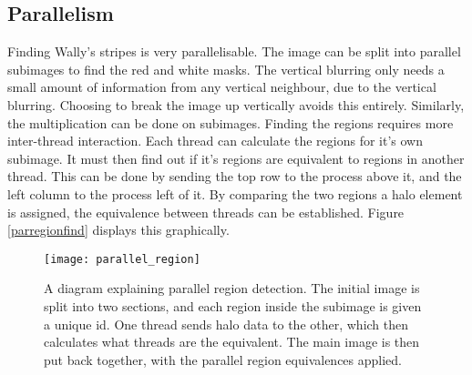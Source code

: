 \documentclass[../main.tex]{subfiles}
\begin{document}
  \subsection{Parallelism}
    Finding Wally's stripes is very parallelisable.
    The image can be split into parallel subimages to find the red and white masks.
    The vertical blurring only needs a small amount of information from any vertical neighbour, due to the vertical blurring.
    Choosing to break the image up vertically avoids this entirely.
    Similarly, the multiplication can be done on subimages.
    Finding the regions requires more inter-thread interaction.
    Each thread can calculate the regions for it's own subimage.
    It must then find out if it's regions are equivalent to regions in another thread.
    This can be done by sending the top row to the process above it, and the left column to the process left of it.
    By comparing the two regions a halo element is assigned, the equivalence between threads can be established.
    Figure \ref{parregionfind} displays this graphically.
    \begin{figure}[H]
      \centering
      \texttt{[image: parallel\_region]}
      \caption{
        A diagram explaining parallel region detection.
        The initial image is split into two sections, and each region inside the subimage is given a unique id.
        One thread sends halo data to the other, which then calculates what threads are the equivalent.
        The main image is then put back together, with the parallel region equivalences applied.
      }
      \label{parrregionfind}
    \end{figure}
    
\end{document}
